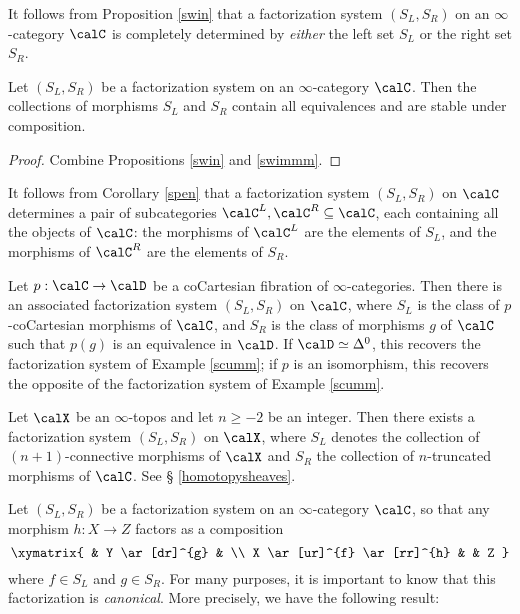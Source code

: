 \begin{remark}
It follows from Proposition \ref{swin} that a factorization system $(S_L, S_R)$ on an $\infty$-category $\calC$ is completely determined by {\em either} the left set $S_L$ or the right set $S_R$.
\end{remark}

\begin{corollary}\label{spen}
Let $(S_L, S_R)$ be a factorization system on an $\infty$-category $\calC$. Then
the collections of morphisms $S_L$ and $S_R$ contain all equivalences and are stable under composition.
\end{corollary}

\begin{proof}
Combine Propositions \ref{swin} and \ref{swimmm}.
\end{proof}

\begin{remark}
It follows from Corollary \ref{spen} that a factorization system $(S_L, S_R)$ on $\calC$ determines a pair of subcategories $\calC^{L}, \calC^{R} \subseteq \calC$, each containing all the objects of $\calC$: the morphisms of $\calC^{L}$ are the elements of $S_L$, and the morphisms of $\calC^{R}$ are the elements of $S_R$.
\end{remark}

\begin{example}
Let $p: \calC \rightarrow \calD$ be a coCartesian fibration of $\infty$-categories. Then there is an associated factorization system $(S_L, S_R)$ on $\calC$, where $S_L$ is the class of $p$-coCartesian morphisms of $\calC$, and $S_R$ is the class of morphisms $g$ of $\calC$ such that
$p(g)$ is an equivalence in $\calD$. If $\calD \simeq \Delta^0$, this recovers the factorization system of Example \ref{scumm}; if $p$ is an isomorphism, this recovers the opposite of the factorization system of Example \ref{scumm}.
\end{example}

\begin{example}\label{spink}
Let $\calX$ be an $\infty$-topos and let $n \geq -2$ be an integer. Then there exists a factorization system $(S_L, S_R)$ on $\calX$, where $S_L$ denotes the collection of $(n+1)$-connective morphisms
of $\calX$ and $S_R$ the collection of $n$-truncated morphisms of $\calC$. See \S 
\ref{homotopysheaves}.
\end{example}

Let $(S_L, S_R)$ be a factorization system on an $\infty$-category $\calC$, so that any morphism
$h: X \rightarrow Z$ factors as a composition
$$ \xymatrix{ & Y \ar[dr]^{g} & \\
X \ar[ur]^{f} \ar[rr]^{h} & & Z }$$
where $f \in S_L$ and $g \in S_R$. For many purposes, it is important to know that this factorization is {\em canonical}. More precisely, we have the following result:

